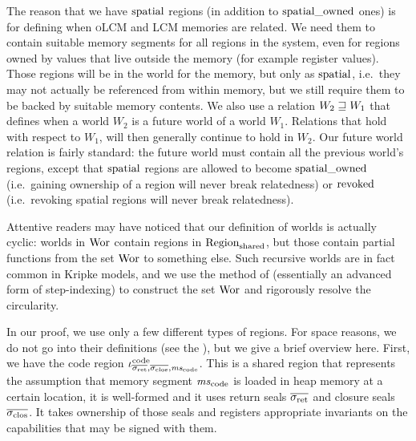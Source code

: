 \documentclass[acmsmall,screen]{acmart}\settopmatter{}
\renewcommand{\Worlds}{\World_{\mathrm{call\_stack}}}
\renewcommand{\Worldfs}{\World_{\mathrm{free\_stack}}}
\renewcommand{\codereg}[2][\mathrm{code}]{\iota^{#1}_{#2}}
\newcommand{\trgcm}{\textsc{LCM}}
\newcommand{\srccm}{\textsc{oLCM}}
\begin{document}
The reason that we have $\mathrm{spatial}$ regions (in addition to $\mathrm{spatial\_owned}$ ones) is for defining when \srccm{} and \trgcm{} memories are related.
We need them to contain suitable memory segments for all regions in the system, even for regions owned by values that live outside the memory (for example register values).
Those regions will be in the world for the memory, but only as $\mathrm{spatial}$, i.e.\ they may not actually be referenced from within memory, but we still require them to be backed by suitable memory contents.
We also use a relation $W_2 \sqsupseteq W_1$ that defines when a world $W_2$ is a future world of a world $W_1$.
Relations that hold with respect to $W_1$, will then generally continue to hold in $W_2$.
Our future world relation is fairly standard: the future world must contain all the previous world's regions, except that $\mathrm{spatial}$ regions are allowed to become $\mathrm{spatial\_owned}$ (i.e.\ gaining ownership of a region will never break relatedness) or $\mathrm{revoked}$ (i.e.\ revoking spatial regions will never break relatedness).

Attentive readers may have noticed that our definition of worlds is actually cyclic: worlds in $\mathrm{Wor}$ contain regions in $\mathrm{Region}_\mathrm{shared}$, but those contain partial functions from the set $\mathrm{Wor}$ to something else.
Such recursive worlds are in fact common in Kripke models, and we use the method of \citet{Birkedal:2011:SKM:1926385.1926401,Birkedal_taste_2014} (essentially an advanced form of step-indexing) to construct the set $\mathrm{Wor}$ and rigorously resolve the circularity.

In our proof, we use only a few different types of regions.
For space reasons, we do not go into their definitions (see the \citet{technical_report}), but we give a brief overview here.
First, we have the code region $\codereg{\sigrets,\sigcloss,\mscode}$.
This is a shared region that represents the assumption that memory segment
$\mscode$ is loaded in heap memory at a certain location, it is well-formed and it uses return seals $\sigrets$ and closure seals $\sigcloss$.
It takes ownership of those seals and registers appropriate invariants on the capabilities that may be signed with them.
\end{document}
